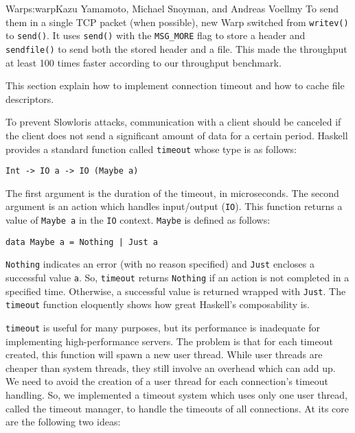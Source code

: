 \begin{aosachapter}{Warp}{s:warp}{Kazu Yamamoto, Michael Snoyman, and Andreas Voellmy}
To send them in a single TCP packet (when possible), new Warp switched
from \texttt{writev()} to \texttt{send()}. It uses \texttt{send()} with
the \texttt{MSG\_MORE} flag to store a header and \texttt{sendfile()} to
send both the stored header and a file. This made the throughput at
least 100 times faster according to our throughput benchmark.


This section explain how to implement connection timeout and how to
cache file descriptors.


\label{sec.warp.connectiontimers}

To prevent Slowloris attacks, communication with a client should be
canceled if the client does not send a significant amount of data for a
certain period. Haskell provides a standard function called
\texttt{timeout} whose type is as follows:

\begin{verbatim}
Int -> IO a -> IO (Maybe a)
\end{verbatim}

The first argument is the duration of the timeout, in microseconds. The
second argument is an action which handles input/output (\texttt{IO}).
This function returns a value of \texttt{Maybe a} in the \texttt{IO}
context. \texttt{Maybe} is defined as follows:

\begin{verbatim}
data Maybe a = Nothing | Just a
\end{verbatim}

\texttt{Nothing} indicates an error (with no reason specified) and
\texttt{Just} encloses a successful value \texttt{a}. So,
\texttt{timeout} returns \texttt{Nothing} if an action is not completed
in a specified time. Otherwise, a successful value is returned wrapped
with \texttt{Just}. The \texttt{timeout} function eloquently shows how
great Haskell's composability is.

\texttt{timeout} is useful for many purposes, but its performance is
inadequate for implementing high-performance servers. The problem is
that for each timeout created, this function will spawn a new user
thread. While user threads are cheaper than system threads, they still
involve an overhead which can add up. We need to avoid the creation of a
user thread for each connection's timeout handling. So, we implemented a
timeout system which uses only one user thread, called the timeout
manager, to handle the timeouts of all connections. At its core are the
following two ideas:


\end{aosachapter}
